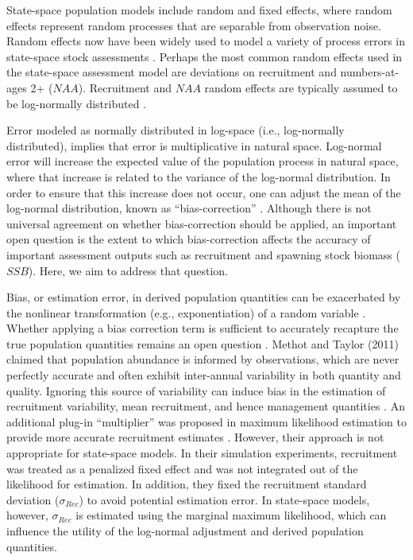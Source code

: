 \documentclass[
  12pt,
]{article}
\begin{document}
State-space population models include random and fixed effects, where
random effects represent random processes that are separable from
observation noise. Random effects now have been widely used to model a
variety of process errors in state-space stock assessments
\citep{Nielsen2014, Cadigan2015, Stock2021}. Perhaps the most common
random effects used in the state-space assessment model are deviations
on recruitment and numbers-at-ages 2+ (\(NAA\)). Recruitment and \(NAA\)
random effects are typically assumed to be log-normally distributed
\citep{Stock2021}.

Error modeled as normally distributed in log-space (i.e., log-normally
distributed), implies that error is multiplicative in natural space.
Log-normal error will increase the expected value of the population
process in natural space, where that increase is related to the variance
of the log-normal distribution. In order to ensure that this increase
does not occur, one can adjust the mean of the log-normal distribution,
known as ``bias-correction'' \citep{Methot2011}. Although there is not
universal agreement on whether bias-correction should be applied, an
important open question is the extent to which bias-correction affects
the accuracy of important assessment outputs such as recruitment and
spawning stock biomass (\(SSB\)). Here, we aim to address that question.

Bias, or estimation error, in derived population quantities can be
exacerbated by the nonlinear transformation (e.g., exponentiation) of a
random variable \citep{Thorson2016}. Whether applying a bias correction
term is sufficient to accurately recapture the true population
quantities remains an open question \citep{Deroba2016}. Methot and
Taylor (2011) claimed that population abundance is informed by
observations, which are never perfectly accurate and often exhibit
inter-annual variability in both quantity and quality. Ignoring this
source of variability can induce bias in the estimation of recruitment
variability, mean recruitment, and hence management quantities
\citep{Methot2011, Thorson2016}. An additional plug-in ``multiplier''
was proposed in maximum likelihood estimation to provide more accurate
recruitment estimates \citep{Methot2011, Thorson2016}. However, their
approach is not appropriate for state-space models. In their simulation
experiments, recruitment was treated as a penalized fixed effect and was
not integrated out of the likelihood for estimation. In addition, they
fixed the recruitment standard deviation (\(\sigma_{Rec}\)) to avoid
potential estimation error. In state-space models, however,
\(\sigma_{Rec}\) is estimated using the marginal maximum likelihood,
which can influence the utility of the log-normal adjustment and derived
population quantities.
\end{document}
